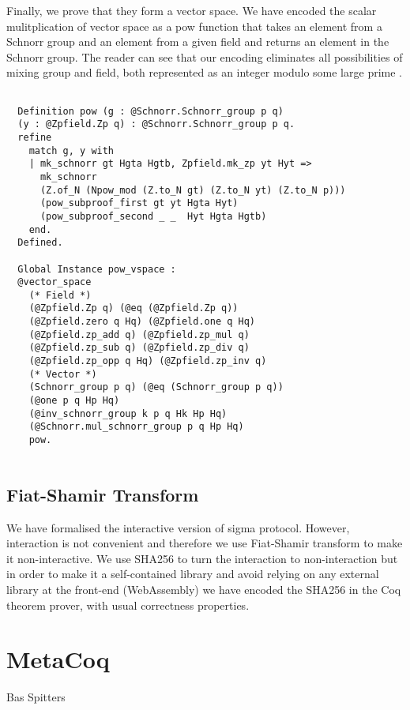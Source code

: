 \documentclass[conference,compsoc]{IEEEtran}
\begin{document}
Finally, we prove that they form a vector space. 
We have encoded the scalar mulitplication of 
vector space as a pow function that takes an element from 
a Schnorr group and an element from 
a given field and returns an element in the 
Schnorr group.  The reader can see that our encoding eliminates all 
possibilities of mixing group and field, both represented 
as an integer modulo some large 
prime \cite{10.1007/978-3-662-63958-0_24}.

\begin{lstlisting}[language=Coq]

  Definition pow (g : @Schnorr.Schnorr_group p q) 
  (y : @Zpfield.Zp q) : @Schnorr.Schnorr_group p q.
  refine 
    match g, y with 
    | mk_schnorr gt Hgta Hgtb, Zpfield.mk_zp yt Hyt => 
      mk_schnorr  
      (Z.of_N (Npow_mod (Z.to_N gt) (Z.to_N yt) (Z.to_N p))) 
      (pow_subproof_first gt yt Hgta Hyt)
      (pow_subproof_second _ _  Hyt Hgta Hgtb)
    end.
  Defined.

  Global Instance pow_vspace : 
  @vector_space 
    (* Field *)
    (@Zpfield.Zp q) (@eq (@Zpfield.Zp q))
    (@Zpfield.zero q Hq) (@Zpfield.one q Hq)
    (@Zpfield.zp_add q) (@Zpfield.zp_mul q)
    (@Zpfield.zp_sub q) (@Zpfield.zp_div q)
    (@Zpfield.zp_opp q Hq) (@Zpfield.zp_inv q)
    (* Vector *)
    (Schnorr_group p q) (@eq (Schnorr_group p q))
    (@one p q Hp Hq) 
    (@inv_schnorr_group k p q Hk Hp Hq)
    (@Schnorr.mul_schnorr_group p q Hp Hq)
    pow.
  
\end{lstlisting}
  
  
 



  \subsection{Fiat-Shamir Transform}
 We have formalised the interactive version of sigma protocol. However,
 interaction is not convenient and therefore
 we use Fiat-Shamir transform to make it non-interactive. We use SHA256 
 to turn the interaction to non-interaction but in order to 
 make it a self-contained library and 
 avoid relying on any external library at the front-end (WebAssembly)
 we have encoded the SHA256 in the Coq theorem prover, with usual correctness 
 properties. 


\section{MetaCoq}
  Bas Spitters 
\end{document}
